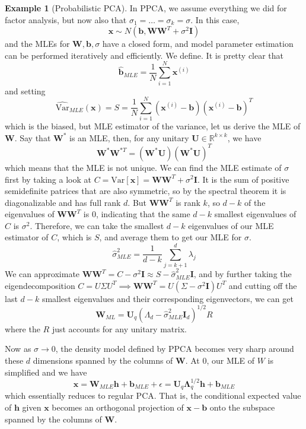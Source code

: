 \documentclass{article}
\theoremstyle{definition}
\newtheorem{example}{Example}[section]
\theoremstyle{remark}
\theoremstyle{definition}
\begin{document}
        \begin{example}[Probabilistic PCA] 
        In PPCA, we assume everything we did for factor analysis, but now also that $\sigma_1 = \ldots = \sigma_k = \sigma$. In this case, 
        \[\mathbf{x} \sim N(\mathbf{b}, \mathbf{W}\mathbf{W}^T + \sigma^2 \mathbf{I})\]
        and the MLEs for $\mathbf{W}, \mathbf{b}, \sigma$ have a closed form, and model parameter estimation can be performed iteratively and efficiently. We define. It is pretty clear that 
        \[\hat{\mathbf{b}}_{MLE} = \frac{1}{N} \sum_{i=1}^N \mathbf{x}^{(i)}\]
        and setting 
        \[\widehat{\mathrm{Var}}_{MLE}(\mathbf{x}) = S = \frac{1}{N} \sum_{i=1}^N (\mathbf{x}^{(i)} - \mathbf{b}) (\mathbf{x}^{(i)} - \mathbf{b})^T\]
        which is the biased, but MLE estimator of the variance, let us derive the MLE of $\mathbf{W}$. Say that $\mathbf{W}^\ast$ is an MLE, then, for any unitary $\mathbf{U} \in \mathbb{R}^{k \times k}$, we have 
        \[\mathbf{W}^\ast \mathbf{W}^{\ast T} = (\mathbf{W}^\ast \mathbf{U}) (\mathbf{W}^\ast \mathbf{U})^T \]
        which means that the MLE is not unique. We can find the MLE estimate of $\sigma$ first by taking a look at $C = \mathrm{Var}[\mathbf{x}] = \mathbf{W} \mathbf{W}^T + \sigma^2 \mathbf{I}$. It is the sum of positive semidefinite patrices that are also symmetric, so by the spectral theorem it is diagonalizable and has full rank $d$. But $\mathbf{W} \mathbf{W}^T$ is rank $k$, so $d - k$ of the eigenvalues of $\mathbf{W} \mathbf{W}^T$ is $0$, indicating that the same $d-k$ smallest eigenvalues of $C$ is $\sigma^2$. Therefore, we can take the smallest $d-k$ eigenvalues of our MLE estimator of $C$, which is $S$, and average them to get our MLE for $\sigma$. 
        \[\hat{\sigma}^2_{MLE} = \frac{1}{d-k} \sum_{j=k+1}^d \lambda_j\]
        We can approximate $\mathbf{W} \mathbf{W}^T = C - \sigma^2 \mathbf{I} \approx S - \hat{\sigma}^2_{MLE} \mathbf{I}$, and by further taking the eigendecomposition $C = U \Sigma U^T \implies \mathbf{W} \mathbf{W}^T = U (\Sigma - \sigma^2 \mathbf{I}) U^T$ and cutting off the last $d-k$ smallest eigenvalues and their corresponding eigenvectors, we can get 
        \[\mathbf{W}_{ML} = \mathbf{U}_q (\Lambda_d - \hat{\sigma}_{MLE}^2 \mathbf{I}_d )^{1/2} R\] 
        where the $R$ just accounts for any unitary matrix. 
        \end{example}

        Now as $\sigma \rightarrow 0$, the density model defined by PPCA becomes very sharp around these $d$ dimensions spanned by the columns of $\mathbf{W}$. At $0$, our MLE of $W$ is simplified and we have 
        \[\mathbf{x} = \mathbf{W}_{MLE} \mathbf{h} + \mathbf{b}_{MLE} + \epsilon = \mathbf{U}_q \boldsymbol{\Lambda}_q^{1/2} \mathbf{h} + \mathbf{b}_{MLE} \]
        which essentially reduces to regular PCA. That is, the conditional expected value of $\mathbf{h}$ given $\mathbf{x}$ becomes an orthogonal projection of $\mathbf{x} - \mathbf{b}$ onto the subspace spanned by the columns of $\mathbf{W}$.  
\end{document}
